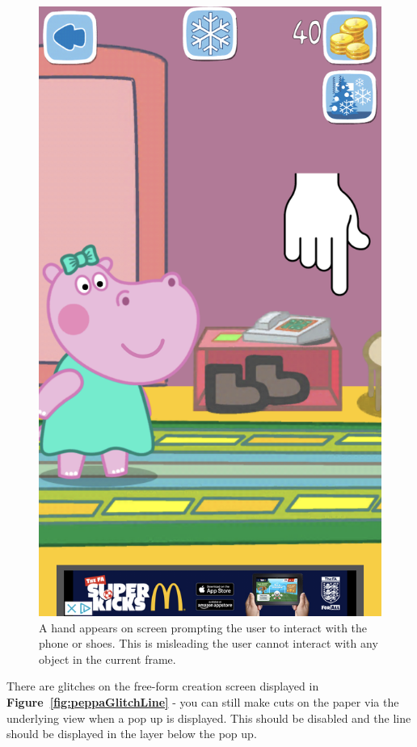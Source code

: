 \documentclass[11pt]{article}
\begin{document}
\begin{figure}[!ht]
\begin{minipage}{0.32\textwidth}
                            \includegraphics[width=0.8\linewidth]{Images/peppa/peppaGlitchPoint.PNG}
                             \caption{A hand appears on screen prompting the user to interact with the phone or shoes. This is misleading the user cannot interact with any object in the current frame.}
                            \label{fig:peppaGlitchPoint}
                        \end{minipage}
                    \end{figure}
                    
                    There are glitches on the free-form creation screen displayed in \textbf{Figure~\ref{fig:peppaGlitchLine}} - you can still make cuts on the paper via the underlying view when a pop up is displayed. This should be disabled and the line should be displayed in the layer below the pop up.
                
\end{document}
